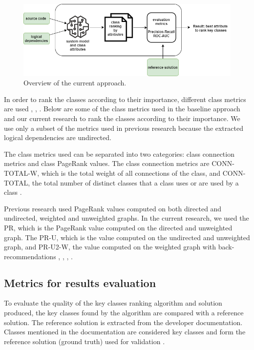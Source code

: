 \documentclass[runningheads]{comsis2}
\begin{document}
\begin{figure}
\centering
\includegraphics[width=\textwidth]{current_approach.PNG}
\caption{Overview of the current approach.}
\label{fig:baseline_approach}
\centering
\end{figure}

In order to rank the classes according to their importance, different class metrics are used \cite{Ding2016AnIA}, \cite{ZaidmanJurnal}, \cite{PAN2018188}. Below are some of the class metrics used in the baseline approach and our current research to rank the classes according to their importance. We use only a subset of the metrics used in previous research because the extracted logical dependencies are undirected.


The class metrics used can be separated into two categories: class connection metrics and class PageRank values.
The class connection metrics are CONN-TOTAL-W, which is the total weight of all connections of the class, and CONN-TOTAL, the total number of distinct classes that a class uses or are used by a class \cite{Finding-key-classes}.

Previous research used PageRank values computed on both directed and undirected, weighted and unweighted graphs. In the current research, we used the PR, which is the PageRank value computed on the directed and unweighted graph. The PR-U, which is the value computed on the undirected and unweighted graph, and PR-U2-W, the value computed on the weighted graph with back-recommendations \cite{PagerankENASE}, \cite{enase15}, \cite{Finding-key-classes}, \cite{PagerankSACI}.




\subsection{Metrics for results evaluation}
\label{sec:evalmetrics}
To evaluate the quality of the key classes ranking algorithm and solution produced, the key classes found by the algorithm are compared with a reference solution. The reference solution is extracted from the developer documentation.  Classes mentioned in the documentation are considered key classes and form the reference solution (ground truth) used for validation \cite{7551990}. 
\end{document}

